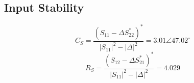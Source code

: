 \subsection{Input Stability}
\begin{equation}
C_{S} = \frac{(S_{11} - \Delta S^{*}_{22})^{*}}{{|S_{11}|}^{2} - {|\Delta|}^{2}} = 3.01 \angle {47.02}^{\circ}
\end{equation}
\begin{equation}
R_{S} = \frac{(S_{12} - \Delta S^{*}_{21})^{*}}{{|S_{11}|}^{2} - {|\Delta|}^{2}} = 4.029 
\end{equation}
